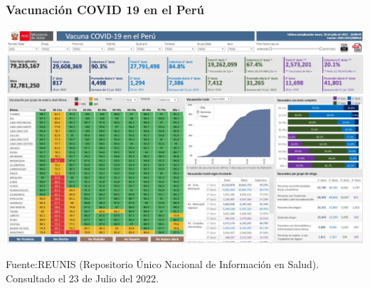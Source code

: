 \documentclass[xcolor=table]{beamer}
\begin{document}
\begin{frame}
	\frametitle{Vacunación COVID 19 en el Perú}
	\vspace{-.5cm}
	\begin{center}
		\includegraphics[width=1\linewidth]{../sala_nacional/vacunas_nacional.jpeg} 
	\end{center}

	{\tiny Fuente:REUNIS (Repositorio Único Nacional de Información en Salud). Consultado el 23 de Julio del 2022.\\} 
	\vspace{0.01cm}
\end{frame}
\end{document}
